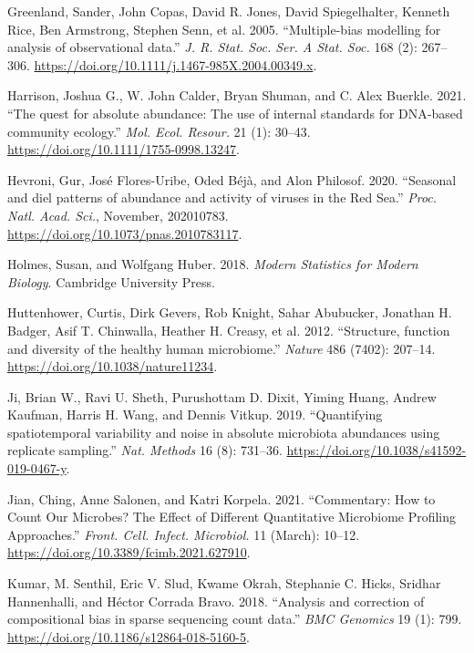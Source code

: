 \documentclass[
]{article}
\newlength{\cslhangindent}
\newlength{\cslentryspacingunit} %
\newenvironment{CSLReferences}[2] %
 {%
  \setlength{\parindent}{0pt}
  \ifodd #1
  \let\oldpar\par
  \def\par{\hangindent=\cslhangindent\oldpar}
  \fi
  \setlength{\parskip}{#2\cslentryspacingunit}
 }%
 {}
\begin{document}
\begin{CSLReferences}{1}{0}
\leavevmode{}%
Greenland, Sander, John Copas, David R. Jones, David Spiegelhalter, Kenneth Rice, Ben Armstrong, Stephen Senn, et al. 2005. {``{Multiple-bias modelling for analysis of observational data}.''} \emph{J. R. Stat. Soc. Ser. A Stat. Soc.} 168 (2): 267--306. \url{https://doi.org/10.1111/j.1467-985X.2004.00349.x}.

\leavevmode{}%
Harrison, Joshua G., W. John Calder, Bryan Shuman, and C. Alex Buerkle. 2021. {``{The quest for absolute abundance: The use of internal standards for DNA‐based community ecology}.''} \emph{Mol. Ecol. Resour.} 21 (1): 30--43. \url{https://doi.org/10.1111/1755-0998.13247}.

\leavevmode{}%
Hevroni, Gur, José Flores-Uribe, Oded Béjà, and Alon Philosof. 2020. {``{Seasonal and diel patterns of abundance and activity of viruses in the Red Sea}.''} \emph{Proc. Natl. Acad. Sci.}, November, 202010783. \url{https://doi.org/10.1073/pnas.2010783117}.

\leavevmode{}%
Holmes, Susan, and Wolfgang Huber. 2018. \emph{Modern Statistics for Modern Biology}. Cambridge University Press.

\leavevmode{}%
Huttenhower, Curtis, Dirk Gevers, Rob Knight, Sahar Abubucker, Jonathan H. Badger, Asif T. Chinwalla, Heather H. Creasy, et al. 2012. {``{Structure, function and diversity of the healthy human microbiome}.''} \emph{Nature} 486 (7402): 207--14. \url{https://doi.org/10.1038/nature11234}.

\leavevmode{}%
Ji, Brian W., Ravi U. Sheth, Purushottam D. Dixit, Yiming Huang, Andrew Kaufman, Harris H. Wang, and Dennis Vitkup. 2019. {``{Quantifying spatiotemporal variability and noise in absolute microbiota abundances using replicate sampling}.''} \emph{Nat. Methods} 16 (8): 731--36. \url{https://doi.org/10.1038/s41592-019-0467-y}.

\leavevmode{}%
Jian, Ching, Anne Salonen, and Katri Korpela. 2021. {``{Commentary: How to Count Our Microbes? The Effect of Different Quantitative Microbiome Profiling Approaches}.''} \emph{Front. Cell. Infect. Microbiol.} 11 (March): 10--12. \url{https://doi.org/10.3389/fcimb.2021.627910}.

\leavevmode{}%
Kumar, M. Senthil, Eric V. Slud, Kwame Okrah, Stephanie C. Hicks, Sridhar Hannenhalli, and Héctor Corrada Bravo. 2018. {``{Analysis and correction of compositional bias in sparse sequencing count data}.''} \emph{BMC Genomics} 19 (1): 799. \url{https://doi.org/10.1186/s12864-018-5160-5}.


\end{CSLReferences}
\end{document}
